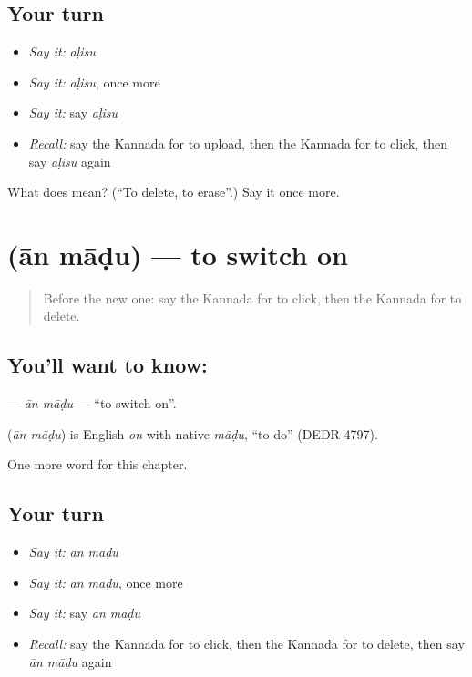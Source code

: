 \subsection*{Your turn}
\begin{itemize}
\raggedright
  \item \emph{Say it:} \emph{aḷisu}
  \item \emph{Say it:} \emph{aḷisu}, once more
  \item \emph{Say it:} say \emph{aḷisu}
  \item \emph{Recall:} say the Kannada for to upload, then the Kannada for to click, then say \emph{aḷisu} again
\end{itemize}

\begin{tcolorbox}[breakable,colback=teal!4,colframe=teal!35!black,title={Before you move on}]
What does  mean? (\textquotedblleft{}To delete, to erase\textquotedblright{}.) Say it once more.
\end{tcolorbox}
\section[\texorpdfstring{\kn{ಆನ್} \kn{ಮಾಡು} (ān māḍu)}{ಆನ್ ಮಾಡು (ān māḍu)}]{  (ān māḍu) — to switch on}

\label{lesson:KA-C164-an-madu}



\begin{quote}
Before the new one: say the Kannada for to click, then the Kannada for to delete.
\end{quote}

\subsection*{You'll want to know:  }
\textbf{ } — \emph{ān māḍu} — \textquotedblleft{}to switch on\textquotedblright{}.

\begin{cousinweb}
\textbf{ } (\emph{ān māḍu}) is English \emph{on} with native \emph{māḍu}, \textquotedblleft{}to do\textquotedblright{} (DEDR 4797).
\end{cousinweb}

\begin{grammarlens}[title={What you've built}]
One more word for this chapter.
\end{grammarlens}

\subsection*{Your turn}
\begin{itemize}
\raggedright
  \item \emph{Say it:} \emph{ān māḍu}
  \item \emph{Say it:} \emph{ān māḍu}, once more
  \item \emph{Say it:} say \emph{ān māḍu}
  \item \emph{Recall:} say the Kannada for to click, then the Kannada for to delete, then say \emph{ān māḍu} again
\end{itemize}

